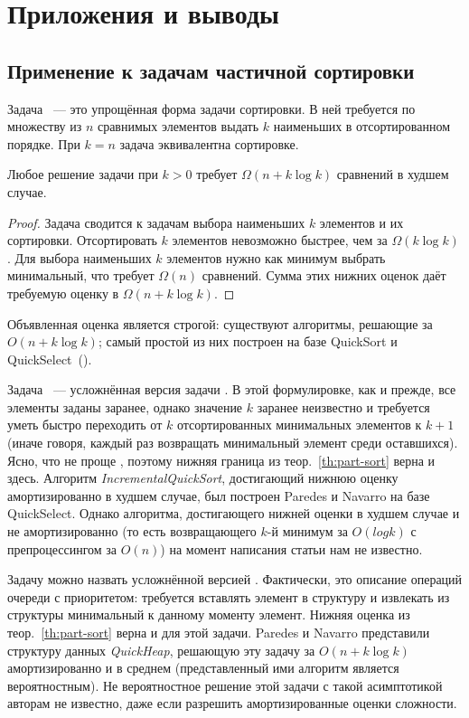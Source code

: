 \chapter{Приложения и выводы} \label{chapt3}

\section{Применение к задачам частичной сортировки}

Задача \PartSort~--- это упрощённая форма задачи сортировки.\cite{partial-sort}
В ней требуется по множеству из $n$ сравнимых элементов выдать $k$ наименьших
в отсортированном порядке. При $k=n$ задача \PartSort эквивалентна сортировке.

\begin{theorem} \label{th:part-sort}
Любое решение задачи \PartSort при $k > 0$ требует $\Omega(n + k \log k)$ сравнений
в худшем случае.
\end{theorem}
\begin{proof}
Задача \PartSort сводится к задачам выбора наименьших $k$ элементов
и их сортировки. Отсортировать $k$ элементов невозможно быстрее,
чем за $\Omega(k \log k)$ . Для выбора наименьших
$k$ элементов нужно как минимум выбрать минимальный, что
требует $\Omega(n)$ сравнений. Сумма этих нижних оценок даёт требуемую
оценку в $\Omega(n+k\log k)$.
\end{proof}

Объявленная оценка является строгой: существуют алгоритмы, решающие
\PartSort за $O(n + k \log k)$; самый простой из них построен на базе
QuickSort и QuickSelect~(\cite{safdsaf}).

Задача \IncSort~--- усложнённая версия задачи \PartSort. В этой формулировке,
как и прежде, все элементы заданы заранее, однако значение $k$ заранее неизвестно
и требуется уметь быстро переходить от $k$ отсортированных минимальных элементов
к $k+1$ (иначе говоря, каждый раз возвращать минимальный элемент среди
оставшихся). Ясно, что \IncSort не проще \PartSort, поэтому нижняя
граница из теор.~\ref{th:part-sort} верна и здесь.
Алгоритм \emph{IncrementalQuickSort}\cite{opt-inc-sort},
достигающий нижнюю оценку амортизированно в худшем случае,
был построен Paredes и Navarro на базе QuickSelect.
Однако алгоритма, достигающего нижней оценки в худшем случае и не амортизированно
(то есть возвращающего $k$-й минимум за $O(log k)$ с препроцессингом
за $O(n)$) на момент написания статьи нам не известно.

Задачу \PriQ можно назвать усложнённой версией \PartSort. Фактически,
это описание операций очереди с приоритетом: требуется вставлять
элемент в структуру и извлекать из структуры минимальный к данному
моменту элемент. Нижняя оценка из теор.~\ref{th:part-sort} верна и
для этой задачи. Paredes и Navarro представили структуру данных
\emph{QuickHeap}\cite{quick-heap}, решающую эту задачу
за $O(n + k \log k)$ амортизированно и в среднем (представленный ими
алгоритм является вероятностным). Не вероятностное решение этой
задачи с такой асимптотикой авторам не известно, даже
если разрешить амортизированные оценки сложности.

